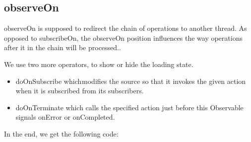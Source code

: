 \subsection{observeOn}
observeOn is supposed to redirect the chain of operations to another thread.
As opposed to subscribeOn, the observeOn position influences the way operations after it in the chain will be processed..

We use two more operators, to show or hide the loading state. 
\begin{itemize}
	\item doOnSubscribe which modifies the source so that it invokes the given action when it is subscribed from its subscribers.
	\item  doOnTerminate which calls the specified action just before this Observable signals onError or onCompleted.
\end{itemize}

In the end, we get the following code:






